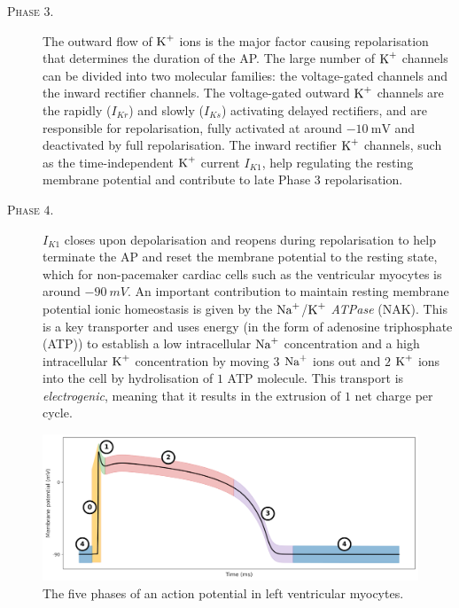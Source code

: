 \begin{description}
	\item[\textsc{Phase $3$.}] The outward flow of $\textrm{K}^{+}$ ions is the major factor causing repolarisation that determines the duration of the AP. The large number of $\textrm{K}^{+}$ channels can be divided into two molecular families: the voltage-gated channels and the inward rectifier channels. The voltage-gated outward $\textrm{K}^{+}$ channels are the rapidly ($I_{Kr}$) and slowly ($I_{Ks}$) activating delayed rectifiers, and are responsible for repolarisation, fully activated at around $\SI{-10}{\milli\volt}$ and deactivated by full repolarisation. The inward rectifier $\textrm{K}^{+}$ channels, such as the time-independent $\textrm{K}^{+}$ current $I_{K1}$, help regulating the resting membrane potential and contribute to late Phase $3$ repolarisation.
	\item[\textsc{Phase $4$.}] $I_{K1}$ closes upon depolarisation and reopens during repolarisation to help terminate the AP and reset the membrane potential to the resting state, which for non-pacemaker cardiac cells such as the ventricular myocytes is around $\SI{-90}{mV}$. An important contribution to maintain resting membrane potential ionic homeostasis is given by the $\textrm{Na}^{+}$/$\textrm{K}^{+}$ \textit{ATPase} (\acs{NAK}). This is a key transporter and uses energy (in the form of adenosine triphosphate (\acs{ATP})) to establish a low intracellular $\textrm{Na}^{+}$ concentration and a high intracellular $\textrm{K}^{+}$ concentration by moving $3$ $\textrm{Na}^{+}$ ions out and $2$ $\textrm{K}^{+}$ ions into the cell by hydrolisation of $1$ ATP molecule. This transport is \textit{electrogenic}, meaning that it results in the extrusion of $1$ net charge per cycle.
\end{description}

\begin{figure}[!ht]
    \myfloatalign
    \includegraphics[width=\textwidth]{figures/chapter01/AP_phases.pdf}
    \caption{The five phases of an action potential in left ventricular myocytes.}
    \label{fig:my_label}
\end{figure}


